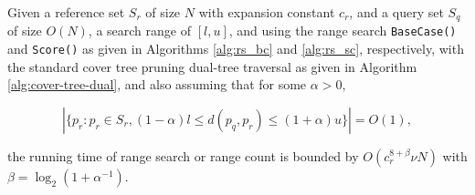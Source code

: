 \begin{thm}
Given a reference set $S_r$ of size $N$ with expansion constant $c_r$, and a
query set $S_q$ of size $O(N)$, a search range of $[l, u]$, and using the range
search \texttt{BaseCase()} and \texttt{Score()} as given in Algorithms
\ref{alg:rs_bc} and \ref{alg:rs_sc}, respectively, with the standard cover tree
pruning dual-tree traversal as given in Algorithm \ref{alg:cover-tree-dual}, and
also assuming that for some $\alpha > 0$,

\begin{equation}
\left| \{ p_r: p_r \in S_r, (1 - \alpha) l \le d(p_q, p_r) \le (1 + \alpha) u \}
\right| = O(1),
\end{equation}

\noindent the running time of range search or range count is bounded by
$O(c_r^{8 + \beta} \nu N)$ with
$\beta = \log_2 (1 + \alpha^{-1})$.
\label{thm:rs}
\end{thm}

